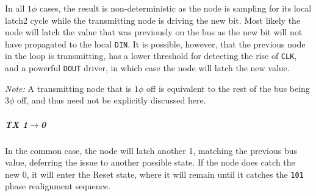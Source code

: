 \begin{figure}[!h]
\noindent{}
\end{figure}

In all $1\phi$ cases, the result is non-deterministic as the node is sampling
for its local {\sc latch2} cycle while the transmitting node is driving the
new bit. Most likely the node will latch the value that was previously on the
bus as the new bit will not have propagated to the local {\tt DIN}.  It is
possible, however, that the previous node in the loop is transmitting, has a
lower threshold for detecting the rise of {\tt CLK}, and a powerful {\tt DOUT}
driver, in which case the node will latch the new value.

\smallskip
\noindent
{\em Note:} A transmitting node that is $1\phi$ off is equivalent to the rest
of the bus being $3\phi$ off, and thus need not be explicitly discussed here.

\subparagraph{TX 1$\rightarrow$0}
In the common case, the node will latch another 1, matching the previous bus
value, deferring the issue to another possible state. If the node does catch
the new 0, it will enter the Reset state, where it will remain until it
catches the {\tt 101} phase realignment sequence.

